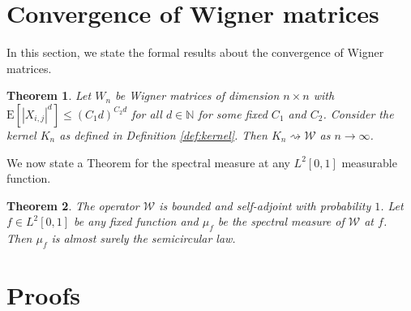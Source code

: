 \documentclass[reqno,12pt]{amsart}
\theoremstyle{plain}
\newtheorem{theorem}{Theorem}
\theoremstyle{definition}
\begin{document}
\section{Convergence of Wigner matrices}
In this section, we state the formal results about the convergence of Wigner matrices. 
\begin{theorem}\label{Thm:wigcon}
    Let $W_{n}$ be Wigner matrices of dimension $n \times n$ with $\mathrm{E}[|X_{i,j}|^{d}]\le (C_{1}d)^{C_{2}d}$ for all $d \in \mathbb{N}$ for some fixed $C_{1}$ and $C_{2}$. Consider the kernel $K_{n}$ as defined in Definition \ref{def:kernel}. Then $K_{n} \rightsquigarrow \mathcal{W}$ as $n \to \infty$.
\end{theorem}
We now state a Theorem for the spectral measure at any $L^{2}[0,1]$ measurable function.
\begin{theorem}\label{Thm:spect}
    The operator $\mathcal{W}$ is bounded and self-adjoint with probability $1$.
    Let $f \in L^{2}[0,1]$ be any fixed function and $\mu_{f}$ be the spectral measure of $\mathcal{W}$ at $f$. Then $\mu_{f}$ is almost surely the semicircular law.
\end{theorem}
\section{Proofs}
\end{document}
